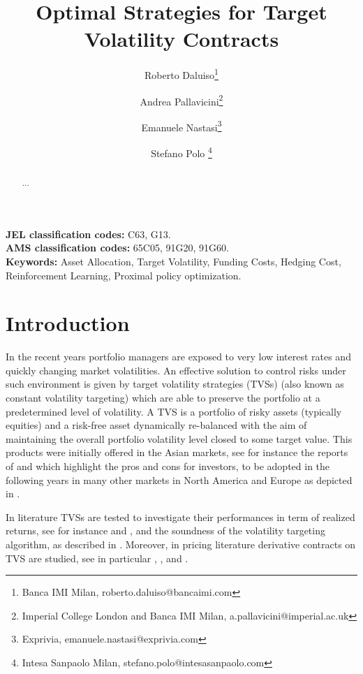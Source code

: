 \documentclass[11pt]{article}
\title{Optimal Strategies for Target Volatility Contracts}
\author{
Roberto Daluiso\thanks{Banca IMI Milan, roberto.daluiso@bancaimi.com}
\and 
  Andrea Pallavicini\thanks{Imperial College London and Banca IMI Milan, a.pallavicini@imperial.ac.uk} 
\and
  Emanuele Nastasi\thanks{Exprivia, emanuele.nastasi@exprivia.com}
  \and Stefano Polo \thanks{Intesa Sanpaolo Milan, stefano.polo@intesasanpaolo.com}%
}
\date{} %
\begin{document}

\maketitle

\begin{abstract}
...
\end{abstract}

\smallskip
\noindent
\textbf{JEL classification codes:} C63, G13.\\
\textbf{AMS classification codes:} 65C05, 91G20, 91G60.\\
\textbf{Keywords:} Asset Allocation, Target Volatility, Funding Costs, Hedging Cost, Reinforcement Learning, Proximal policy optimization. 
\clearpage
\tableofcontents
\clearpage
\pagestyle{fancy}  
\section{Introduction}
In the recent years portfolio managers are exposed to very low interest rates and quickly changing market volatilities. An effective solution to control risks under such environment is given by target volatility strategies (TVSs) (also known as constant volatility targeting) which are able to preserve the portfolio at a predetermined level of volatility. A TVS is  a  portfolio  of  risky  assets  (typically  equities)  and  a  risk-free  asset dynamically re-balanced with the aim of maintaining the overall portfolio volatility level closed to some target value. This products were initially offered in the Asian markets, see for instance the reports of \cite{Chew} and \cite{XUE} which highlight the pros and cons for investors, to be adopted in the following years in many other markets in North America and Europe as depicted in \cite{Morrison}.

In literature TVSs are tested to investigate their performances in term of realized returns, see for instance \cite{Hocquard28} and \cite{PERCHET}, and the soundness of the volatility targeting algorithm, as described in \cite{Kim}. Moreover, in pricing literature derivative contracts on TVS are studied, see in particular \cite{Di_Graziano}, \cite{Grasselli}, and \cite{Albeverio}. 
\end{document}
